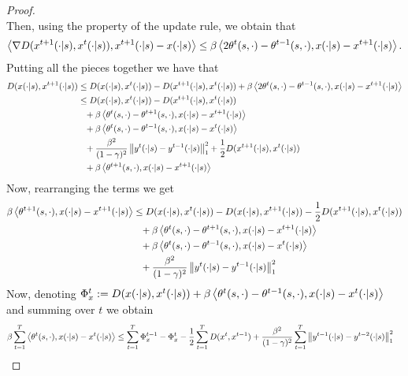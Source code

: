 \begin{proof}
\begin{equation*}
\end{equation*}
Then, using the property of the update rule, we obtain that 
\begin{equation*}
\left\langle{\nabla D(x^{t+1}(\cdot|s), x^t(\cdot|s))},{x^{t+1}(\cdot|s) - x(\cdot|s)}\right\rangle \leq  \beta \left\langle{2 \theta^{t}(s,\cdot) - \theta^{t-1}(s,\cdot)},{x(\cdot|s) - x^{t+1}(\cdot|s)}\right\rangle.
\end{equation*}
Putting all the pieces together we have that
\begin{align*}
D(x(\cdot|s),x^{t+1}(\cdot|s)) &\leq D(x(\cdot|s),x^{t}(\cdot|s)) - D(x^{t+1}(\cdot|s),x^{t}(\cdot|s)) +  \beta \left\langle{2 \theta^{t}(s,\cdot) - \theta^{t-1}(s,\cdot)},{x(\cdot|s) - x^{t+1}(\cdot|s)}\right\rangle \\
&\leq D(x(\cdot|s),x^{t}(\cdot|s)) - D(x^{t+1}(\cdot|s),x^{t}(\cdot|s)) \\
&\phantom{=} +  \beta \left\langle{ \theta^{t}(s,\cdot) - \theta^{t+1}(s, \cdot)},{x(\cdot|s) - x^{t+1}(\cdot|s)}\right\rangle \\
&\phantom{=}+  \beta \left\langle{ \theta^{t}(s,\cdot) - \theta^{t-1}(s, \cdot)},{x(\cdot|s) - x^{t}(\cdot|s)}\right\rangle \\
&\phantom{=}+  \frac{ \beta^2}{(1 - \gamma)^2} \left\lVert y^{t}(\cdot|s) - y^{t-1}(\cdot|s)\right\rVert^2_1 + \frac{1}{2}D(x^{t+1}(\cdot|s),x^{t}(\cdot|s)) \\
&\phantom{=}+ \beta \left\langle{ \theta^{t+1}(s, \cdot)},{x(\cdot|s) - x^{t+1}(\cdot|s)}\right\rangle
\end{align*}
Now, rearranging the terms we get
\begin{align*}
 \beta \left\langle{ \theta^{t+1}(s, \cdot)},{x(\cdot|s) - x^{t+1}(\cdot|s)}\right\rangle
&\leq D(x(\cdot|s),x^{t}(\cdot|s)) - D(x(\cdot|s),x^{t+1}(\cdot|s)) - \frac{1}{2}D(x^{t+1}(\cdot|s),x^{t}(\cdot|s)) \\
&\phantom{=} +  \beta \left\langle{ \theta^{t}(s,\cdot) - \theta^{t+1}(s, \cdot)},{x(\cdot|s) - x^{t+1}(\cdot|s)}\right\rangle \\
&\phantom{=}+  \beta \left\langle{ \theta^{t}(s,\cdot) - \theta^{t-1}(s, \cdot)},{x(\cdot|s) - x^{t}(\cdot|s)}\right\rangle \\
&\phantom{=}+  \frac{ \beta^2}{(1 - \gamma)^2} \left\lVert y^{t}(\cdot|s) - y^{t-1}(\cdot|s)\right\rVert^2_1 
\end{align*}
Now, denoting $\Phi_x^t := D(x(\cdot|s),x^{t}(\cdot|s)) +   \beta \left\langle{ \theta^{t}(s,\cdot) - \theta^{t-1}(s, \cdot)},{x(\cdot|s) - x^{t}(\cdot|s)}\right\rangle$ and summing over $t$ we obtain
\begin{align*}
 \beta \sum^T_{t=1}\innerprod{ \theta^{t}(s, \cdot)}{x(\cdot|s) - x^{t}(\cdot|s)}
&\leq \sum^T_{t=1} \Phi_x^{t-1} - \Phi_x^t - \frac{1}{2} \sum^T_{t=1} D(x^t, x^{t-1}) +  \frac{ \beta^2}{(1 - \gamma)^2} \sum^T_{t=1} \norm{y^{t-1}(\cdot|s) - y^{t-2}(\cdot|s)}^2_1 

\end{align*}
\end{proof}
